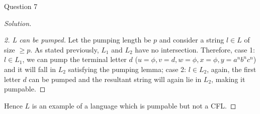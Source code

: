 \begin{solution}{Question 7}
\begin{proof}[Solution]
        \begin{proof}[2. L can be pumped]
        Let the pumping length be $p$ and consider a string $l \in L$ of size $\geq p$. As stated previously, $L_1$ and $L_2$ have no intersection. Therefore, case 1: \textit{$l\in L_1$}, we can pump the terminal letter $d$ ($u = \phi, v = d, w = \phi, x = \phi, y = a^nb^nc^n$) and it will fall in $L_2$ satisfying the pumping lemma; case 2: \textit{$l \in L_2$}, again, the first letter $d$ can be pumped and the resultant string will again lie in $L_2$, making it pumpable.
        
        \end{proof}
        
        Hence $L$ is an example of a language which is pumpable but not a CFL.
        
        \end{proof}
\end{solution}
